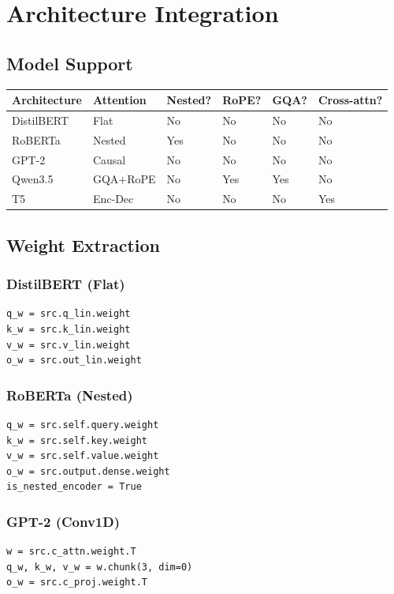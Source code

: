 \section{Architecture Integration}

\subsection{Model Support}

\begin{table}[H]
\centering
\small
\begin{tabular}{llllll}
\toprule
\textbf{Architecture} & \textbf{Attention} & \textbf{Nested?} & \textbf{RoPE?} & \textbf{GQA?} & \textbf{Cross-attn?} \\
\midrule
DistilBERT & Flat & No & No & No & No \\
RoBERTa & Nested & Yes & No & No & No \\
GPT-2 & Causal & No & No & No & No \\
Qwen3.5 & GQA+RoPE & No & Yes & Yes & No \\
T5 & Enc-Dec & No & No & No & Yes \\
\bottomrule
\end{tabular}
\end{table}

\subsection{Weight Extraction}

\subsubsection{DistilBERT (Flat)}
\begin{lstlisting}
q_w = src.q_lin.weight
k_w = src.k_lin.weight
v_w = src.v_lin.weight
o_w = src.out_lin.weight
\end{lstlisting}

\subsubsection{RoBERTa (Nested)}
\begin{lstlisting}
q_w = src.self.query.weight
k_w = src.self.key.weight
v_w = src.self.value.weight
o_w = src.output.dense.weight
is_nested_encoder = True
\end{lstlisting}

\subsubsection{GPT-2 (Conv1D)}
\begin{lstlisting}
w = src.c_attn.weight.T
q_w, k_w, v_w = w.chunk(3, dim=0)
o_w = src.c_proj.weight.T
\end{lstlisting}

